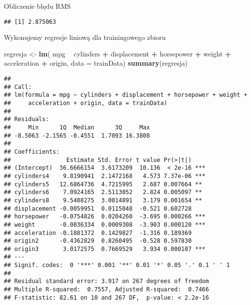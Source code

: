 \documentclass[
]{article}
\newenvironment{Shaded}{\begin{snugshade}}{\end{snugshade}}
\newcommand{\DataTypeTok}[1]{\textcolor[rgb]{0.13,0.29,0.53}{#1}}
\newcommand{\DecValTok}[1]{\textcolor[rgb]{0.00,0.00,0.81}{#1}}
\newcommand{\KeywordTok}[1]{\textcolor[rgb]{0.13,0.29,0.53}{\textbf{#1}}}
\newcommand{\NormalTok}[1]{#1}
\newcommand{\OperatorTok}[1]{\textcolor[rgb]{0.81,0.36,0.00}{\textbf{#1}}}
\newcommand{\StringTok}[1]{\textcolor[rgb]{0.31,0.60,0.02}{#1}}
\begin{document}
Obliczenie błędu RMS

\begin{Shaded}
\end{Shaded}

\begin{verbatim}
## [1] 2.875063
\end{verbatim}

Wykonujemy regresje liniową dla trainingowego zbioru

\begin{Shaded}
\begin{Highlighting}[]
\NormalTok{regresja <-}\StringTok{ }\KeywordTok{lm}\NormalTok{( mpg }\OperatorTok{~}\StringTok{ }\NormalTok{cylinders }\OperatorTok{+}\StringTok{ }\NormalTok{displacement }\OperatorTok{+}\StringTok{ }\NormalTok{horsepower }\OperatorTok{+}\StringTok{ }\NormalTok{weight  }\OperatorTok{+}\StringTok{ }\NormalTok{acceleration }\OperatorTok{+}\StringTok{ }\NormalTok{origin, }\DataTypeTok{data =}\NormalTok{ trainData)}
\KeywordTok{summary}\NormalTok{(regresja)}
\end{Highlighting}
\end{Shaded}

\begin{verbatim}
## 
## Call:
## lm(formula = mpg ~ cylinders + displacement + horsepower + weight + 
##     acceleration + origin, data = trainData)
## 
## Residuals:
##     Min      1Q  Median      3Q     Max 
## -8.5063 -2.1565 -0.4551  1.7093 16.3808 
## 
## Coefficients:
##                Estimate Std. Error t value Pr(>|t|)    
## (Intercept)  36.6666154  3.6173209  10.136  < 2e-16 ***
## cylinders4    9.8190941  2.1472168   4.573 7.37e-06 ***
## cylinders5   12.6864736  4.7215995   2.687 0.007664 ** 
## cylinders6    7.0924165  2.5113052   2.824 0.005097 ** 
## cylinders8    9.5408275  3.0014891   3.179 0.001654 ** 
## displacement -0.0059951  0.0115048  -0.521 0.602728    
## horsepower   -0.0754826  0.0204260  -3.695 0.000266 ***
## weight       -0.0036334  0.0009308  -3.903 0.000120 ***
## acceleration -0.1881372  0.1429827  -1.316 0.189369    
## origin2      -0.4362829  0.8260495  -0.528 0.597830    
## origin3       3.0172575  0.7669529   3.934 0.000107 ***
## ---
## Signif. codes:  0 '***' 0.001 '**' 0.01 '*' 0.05 '.' 0.1 ' ' 1
## 
## Residual standard error: 3.917 on 267 degrees of freedom
## Multiple R-squared:  0.7557, Adjusted R-squared:  0.7466 
## F-statistic: 82.61 on 10 and 267 DF,  p-value: < 2.2e-16
\end{verbatim}
\end{document}
